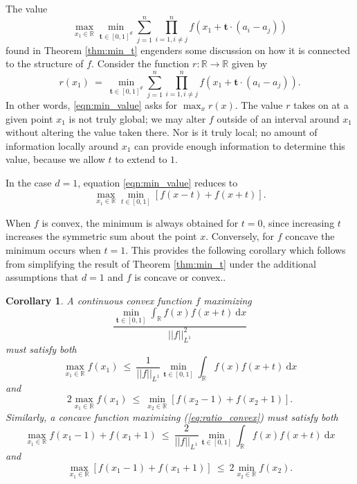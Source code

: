 \documentclass[11pt,reqno]{amsart}
\numberwithin{equation}{section}
\theoremstyle{plain}
\newtheorem{corollary}[thm]{Corollary}
\newcommand{\R}{\ensuremath{\mathbb{R}}}
\begin{document}
The value
\begin{equation}\label{eqn:min_value}
    \max\limits_{x_1 \in \R}\min\limits_{\mathbf{t}\in[0,1]^d}\sum\limits_{j=1}^n \prod\limits_{i=1,i\neq j}^{n}f(x_1+\mathbf{t}\cdot (a_i-a_j))
\end{equation}
found in Theorem \ref{thm:min_t} engenders some discussion on how it is connected to the structure of $f$. Consider the function $r:\R \to \R$ given by
\begin{equation}
    r(x_1)\ = \ \min\limits_{\mathbf{t}\in[0,1]^d}\sum\limits_{j=1}^n \prod\limits_{i=1,i\neq j}^{n}f(x_1+\mathbf{t}\cdot (a_i-a_j)).
\end{equation}
In other words, \eqref{eqn:min_value} asks for $\max_{x}r(x)$. The value $r$ takes on at a given point $x_1$ is not truly global; we may alter $f$ outside of an interval around $x_1$ without altering the value taken there. Nor is it truly local; no amount of information locally around $x_1$ can provide enough information to determine this value, because we allow $t$ to extend to $1$.

In the case $d=1$, equation \eqref{eqn:min_value} reduces to
\begin{equation}
    \max\limits_{x_1 \in \R}\min\limits_{t\in[0,1]}[f(x-t)+f(x+t)].
\end{equation}

When $f$ is convex, the minimum is always obtained for $t=0$, since increasing $t$ increases the symmetric sum about the point $x$. Conversely, for $f$ concave the minimum occurs when $t=1$. This provides the following corollary which follows from simplifying the result of Theorem \ref{thm:min_t} under the additional assumptions that $d = 1$ and $f$ is concave or convex..

\begin{corollary}\label{cor:convex_f}
A continuous convex function $f$ maximizing
\begin{equation}\label{eq:ratio_convex}
    \frac{\min\limits_{\mathbf{t}\in[0,1]}\displaystyle\int_{\R}f(x)f(x+t)\ \mathrm{d}x}{||f||_{L^1}^{2}}
\end{equation}
must satisfy both
\begin{equation}
    \max\limits_{x_1 \in \R}f(x_1)\ \le \ \frac{1}{||f||_{L^1}}\min\limits_{\mathbf{t}\in[0,1]}\int_{\R}f(x)f(x+t)\ \mathrm{d}x
\end{equation}
and
\begin{equation}
    2\max\limits_{x_1 \in \R}f(x_1)\ \le \ \min\limits_{x_2 \in \R}[f(x_2-1)+f(x_2+1)].
\end{equation}
Similarly, a concave function maximizing (\ref{eq:ratio_convex}) must satisfy both
\begin{equation}
    \max\limits_{x_1 \in \R}f(x_1-1)+f(x_1+1)\ \le \ \frac{2}{||f||_{L^1}}\min\limits_{\mathbf{t}\in[0,1]}\int_{\R}f(x)f(x+t)\ \mathrm{d}x
\end{equation}
and
\begin{equation}
    \max\limits_{x_1 \in \R}[f(x_1-1)+f(x_1+1)]\ \le \ 2\min\limits_{x_2 \in \R}f(x_2).
\end{equation}
\end{corollary}
\end{document}
